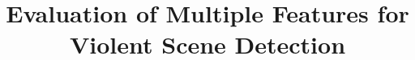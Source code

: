 \documentclass[twocolumn]{bmcart}%
\begin{document}
\begin{frontmatter}

\begin{fmbox}


\title{Evaluation of Multiple Features for \\
	Violent Scene Detection}


\author[
   addressref={aff1},                   %
   email={lqvu@fit.hcmus.edu.vn}   %
]{ }
\author[
   addressref={aff2},
   email={plsang@nii.ac.jp}
]{ }
\author[
addressref={aff2},
email={ledduy@nii.ac.jp}
]{ }
\author[
addressref={aff2},
email={satoh@nii.ac.jp}
]{ }
\author[
addressref={aff3},
email={ducda@uit.edu.vn}
]{ }



\end{fmbox}
\end{frontmatter}
\end{document}
